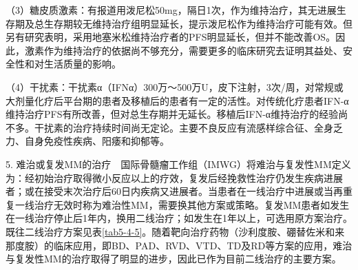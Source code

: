 （3）糖皮质激素：有报道用泼尼松50mg，隔日1次，作为维持治疗，其无进展生存期及总生存期较无维持治疗组明显延长，提示泼尼松作为维持治疗可能有效。但另有研究表明，采用地塞米松维持治疗者的PFS明显延长，但并不能改善OS。因此，激素作为维持治疗的依据尚不够充分，需要更多的临床研究去证明其益处、安全性和对生活质量的影响。

（4）干扰素：干扰素α（IFNα）300万～500万U，皮下注射，3次/周，对常规或大剂量化疗后平台期的患者及移植后的患者有一定的活性。对传统化疗患者IFN-α维持治疗PFS有所改善，但对总生存期并无延长。移植后IFN-α维持治疗的经验尚不多。干扰素的治疗持续时间尚无定论。主要不良反应有流感样综合征、全身乏力、自身免疫性疾病、阳痿和抑郁等。

5.
难治或复发MM的治疗　国际骨髓瘤工作组（IMWG）将难治与复发性MM定义为：经初始治疗取得微小反应以上的疗效，复发后经挽救性治疗仍发生疾病进展者；或在接受末次治疗后60日内疾病又进展者。当患者在一线治疗中进展或当再重复一线治疗无效时称为难治性MM，需要换其他方案或策略。复发MM患者如发生在一线治疗停止后1年内，换用二线治疗；如发生在1年以上，可选用原方案治疗。既往二线治疗方案见表\ref{tab5-4-5}。随着靶向治疗药物（沙利度胺、硼替佐米和来那度胺）的临床应用，即BD、PAD、RVD、VTD、TD及RD等方案的应用，难治与复发性MM的治疗取得了明显的进步，因此已作为目前二线治疗的主要方案。

